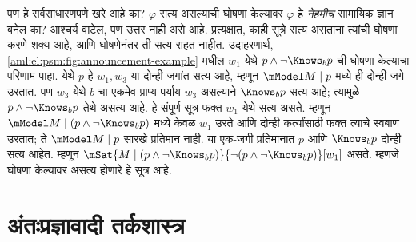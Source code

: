 पण हे सर्वसाधारणपणे खरे आहे का? $\varphi$ सत्य असल्याची
घोषणा केल्यावर $\varphi$ हे \emph{नेहमीच} सामायिक ज्ञान बनेल
का? आश्चर्य वाटेल, पण उत्तर नाही असे आहे. प्रत्यक्षात,
काही सूत्रे सत्य असताना त्यांची घोषणा करणे
शक्य आहे, आणि घोषणेनंतर ती सत्य राहत नाहीत.
उदाहरणार्थ, \ref{aml:el:psm:fig:announcement-example} मधील
$w_1$ येथे $p \land \lnot \Knows_b p$ ची घोषणा
केल्याचा परिणाम पाहा. येथे $p$ हे $w_1,w_3$ या
दोन्ही जगांत सत्य आहे, म्हणून $\mModel M\mid p$ मध्ये
ही दोन्ही जगे उरतात. पण $w_3$ येथे $b$ चा एकमेव
प्राप्य पर्याय $w_3$ असल्याने $\Knows_b p$ सत्य आहे;
त्यामुळे $p\land\lnot\Knows_b p$ तेथे असत्य आहे.
हे संपूर्ण सूत्र फक्त $w_1$ येथे सत्य असते. म्हणून
$\mModel M\mid(p\land\lnot\Knows_b p)$ मध्ये केवळ
$w_1$ उरते आणि दोन्ही कर्त्यांसाठी फक्त त्याचे स्वबाण
उरतात; ते $\mModel M\mid p$ सारखे प्रतिमान नाही.
या एक-जगी प्रतिमानात $p$ आणि $\Knows_b p$ दोन्ही
सत्य आहेत. म्हणून
$\mSat{M \mid (p \land \lnot \Knows_b p)}{\lnot
(p \land \lnot \Knows_b p)}[w_1]$ असते. म्हणजे
घोषणा केल्यावर असत्य होणारे हे सूत्र आहे.



\part{अंतःप्रज्ञावादी तर्कशास्त्र}\label{int:part}

